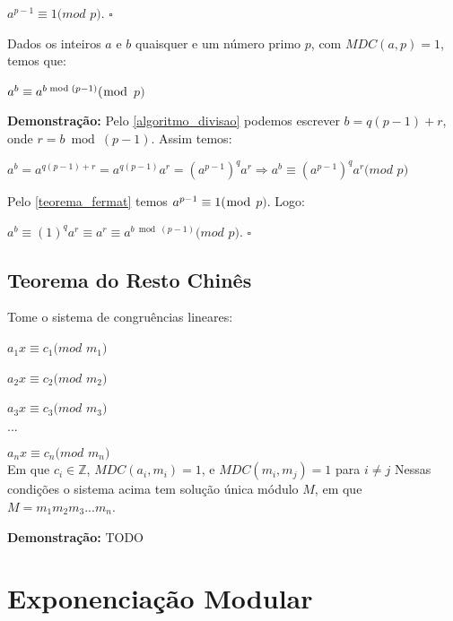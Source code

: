 $a^{p-1}\equiv 1(mod$ $p)$. $\square$
\\


\begin{theorem}\label{teorema_fermat_expansao}
Dados os inteiros $a$ e $b$ quaisquer e um número primo $p$, com $MDC(a, p) = 1$, temos que:

$a^{b} \equiv a^{b \bmod (p-1)} (\bmod$ $p)$

\end{theorem}
\textbf{Demonstração:}
Pelo \autoref{algoritmo_divisao} podemos escrever $b=q(p-1)+r$, onde $r=b\bmod(p-1)$. Assim temos:

$a^b = a^{q(p-1)+r} = a^{q(p-1)}a^r = (a^{p-1})^qa^r \Rightarrow a^b \equiv (a^{p-1})^qa^r (mod$ $p)$ 

Pelo \autoref{teorema_fermat} temos $a^{p-1} \equiv 1 (\bmod$ $p)$. Logo:

$a^b \equiv (1)^qa^r \equiv a^r \equiv a^{b \bmod (p-1)} (mod$ $p)$. $\square$
\\


\subsection{Teorema do Resto Chinês}

\begin{theorem}
Tome o sistema de congruências lineares:

$a_1x \equiv c_1 (mod$ $m_1)$

$a_2x \equiv c_2 (mod$ $m_2)$

$a_3x \equiv c_3 (mod$ $m_3)$

$...$

$a_nx \equiv c_n (mod$ $m_n)$\\

Em que $c_i \in \mathbb{Z}$, $MDC(a_i,m_i) = 1$, e $MDC(m_i, m_j) = 1$ para $i \neq j$
Nessas condições o sistema acima tem solução única módulo $M$, em que $M = m_1m_2m_3...m_n$.
\end{theorem}
\textbf{Demonstração:}
TODO



\section{Exponenciação Modular}

